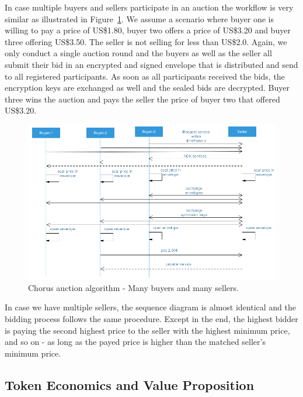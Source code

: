 \documentclass{llncs}
\begin{document}
{			In case multiple buyers and sellers participate in an auction the workflow is very similar as illustrated in Figure~\ref{fig:auction-algorithm-X-X}. We assume a scenario where buyer one is willing to pay a price of US\$1.80, buyer two offers a price of US\$3.20 and buyer three offering US\$3.50. The seller is not selling for less than US\$2.0. Again, we only conduct a single auction round and the buyers as well as the seller all submit their bid in an encrypted and signed envelope that is distributed and send to all registered participants. As soon as all participants received the bids, the encryption keys are exchanged as well and the sealed bids are decrypted. Buyer three wins the auction and pays the seller the price of buyer two that offered US\$3.20.
			\begin{figure}
				\centering
				\includegraphics[scale=0.4]{Figures/auction/20180501_auction-aglorithms--X-to-X.png}
				\caption{Chorus auction algorithm - Many buyers and many sellers.}	
				\label{fig:auction-algorithm-X-X}
			\end{figure}			
			In case we have multiple sellers, the sequence diagram is almost identical and the bidding process follows the same procedure. Except in the end, the highest bidder is paying the second highest price to  the seller with the highest minimum price, and so on - as long as the payed price is higher than the matched seller's minimum price.
			 


		\subsection{Token Economics and Value Proposition}
			\label{ss:token-economics}

}
\end{document}
